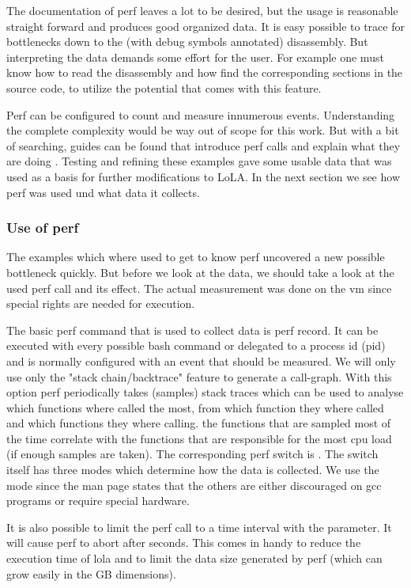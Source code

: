 The documentation of perf leaves a lot to be desired, but the usage is reasonable straight forward and produces good organized data. It is easy possible to trace for bottlenecks down to the (with debug symbols annotated) disassembly. But interpreting the data demands some effort for the user. For example one must know how to read the disassembly and how find the corresponding sections in the source code, to utilize the potential that comes with this feature.

Perf can be configured to count and measure innumerous events. Understanding the complete complexity would be way out of scope for this work. But with a bit of searching, guides can be found that introduce perf calls and explain what they are doing \cite{perfExamples}. Testing and refining these examples gave some usable data that was used as a basis for further modifications to LoLA. In the next section we see how perf was used und what data it collects.

\subsubsection{Use of perf}
The examples which where used to get to know perf uncovered a new possible bottleneck quickly. But before we look at the data, we should take a look at the used perf call and its effect. The actual measurement was done on the vm since special rights are needed for execution.

The basic perf command that is used to collect data is perf record. It can be executed with every possible bash command or delegated to a process id (pid) and is normally configured with an event that should be measured. We will only use only the "stack chain/backtrace" feature to generate a call-graph. With this option perf periodically takes (samples) stack traces which can be used to analyse which functions where called the most, from which function they where called and which functions they where calling. the functions that are sampled most of the time correlate with the functions that are responsible for the most cpu load (if enough samples are taken). The corresponding perf switch is . The switch itself has three modes which determine how the data is collected. We use the  mode since the man page states that the others are either discouraged on gcc programs or require special hardware.

It is also possible to limit the perf call to a time interval with the  parameter. It will cause perf to abort after  seconds. This comes in handy to reduce the execution time of lola and to limit the data size generated by perf (which can grow easily in the GB dimensions).

